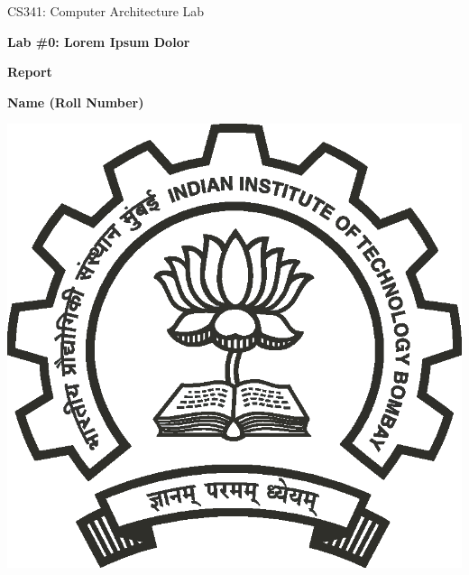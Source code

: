 \documentclass[11pt,swedish, openany]{book}
\begin{document}

\begin{titlepage}
	\clearpage\thispagestyle{empty}
	\centering
	\vspace{2cm}

	{\large CS341: Computer Architecture Lab\par}
	\vspace{4cm}
	{\Huge \textbf{Lab \#0: Lorem Ipsum Dolor}} \\
	\vspace{0.2cm}
	{\huge \textbf{Report} \par}
	\vspace{4cm}
	{\normalsize {\large \textbf{Name (Roll Number)}}
	             \par}
	\vspace{2cm}
	\vfill

    \includegraphics[scale=0.30]{iitb_logo/iitb_logo.eps}
    

\end{titlepage}
\end{document}
